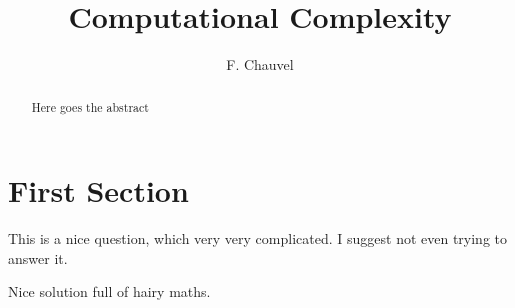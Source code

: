 \documentclass{aldast}
\title{Computational Complexity}
\author{F. Chauvel}
\begin{document}
\maketitle

\begin{abstract}
   Here goes the abstract
\end{abstract}


\section{First Section}

\begin{question}
  This is a nice question, which very very complicated. I suggest not
  even trying to answer it.
\end{question}

\begin{solution}
  Nice solution full of hairy maths.
\end{solution}



\end{document}
